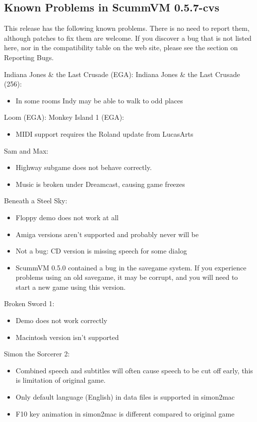 

\subsection{Known Problems in ScummVM 0.5.7-cvs}

This release has the following known problems. There is no need to report them,
although patches to fix them are welcome. If you discover a bug that is not
listed here, nor in the compatibility table on the web site, please see
the section on Reporting Bugs.

Indiana Jones \& the Last Crusade (EGA):
Indiana Jones \& the Last Crusade (256):
  \begin{itemize}
  \item In some rooms Indy may be able to walk to odd places
  \end{itemize}
Loom (EGA):
Monkey Island 1 (EGA):
  \begin{itemize}
  \item MIDI support requires the Roland update from LucasArts
  \end{itemize}
Sam and Max:
  \begin{itemize}
  \item Highway subgame does not behave correctly.
  \item Music is broken under Dreamcast, causing game freezes
  \end{itemize}
Beneath a Steel Sky:
  \begin{itemize}
  \item Floppy demo does not work at all
  \item Amiga versions aren't supported and probably never will be
  \item Not a bug: CD version is missing speech for some dialog
  \item ScummVM 0.5.0 contained a bug in the savegame system.
                  If you experience problems using an old savegame, it may be
                  corrupt, and you will need to start a new game using this
                  version.
  \end{itemize}
Broken Sword 1:
  \begin{itemize}
  \item Demo does not work correctly
  \item Macintosh version isn't supported
  \end{itemize}
Simon the Sorcerer 2:
  \begin{itemize}
  \item Combined speech and subtitles will often cause speech to be
                  cut off early, this is limitation of original game.
  \item Only default language (English) in data files is supported
                  in simon2mac
  \item F10 key animation in simon2mac is different compared to
                  original game
  \end{itemize}
